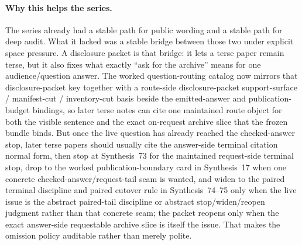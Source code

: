 \documentclass[11pt]{article}
\begin{document}
\paragraph{Why this helps the series.}
The series already had a stable path for public wording and a stable path for deep audit.
What it lacked was a stable bridge between those two under explicit space pressure.
A disclosure packet is that bridge: it lets a terse paper remain terse, but it also fixes what exactly ``ask for the archive'' means for one audience/question answer. The worked question-routing catalog now mirrors that disclosure-packet key together with a route-side disclosure-packet support-surface / manifest-cut / inventory-cut basis beside the emitted-answer and publication-budget bindings, so later terse notes can cite one maintained route object for both the visible sentence and the exact on-request archive slice that the frozen bundle binds.
But once the live question has already reached the checked-answer stop, later terse papers should usually cite the answer-side terminal citation normal form, then stop at Synthesis~73 for the maintained request-side terminal stop, drop to the worked publication-boundary card in Synthesis~17 when one concrete checked-answer/request-tail seam is wanted, and widen to the paired terminal discipline and paired cutover rule in Synthesis~74--75 only when the live issue is the abstract paired-tail discipline or abstract stop/widen/reopen judgment rather than that concrete seam; the packet reopens only when the exact answer-side requestable archive slice is itself the issue.\cite{series:challengeanswerreviewmenus,series:publicrequestresponsepacketrefreshresponsepacketclosureverdicts,series:pairedterminalcitationdiscipline,series:pairedterminalcutoverrules,series:workedexample}
That makes the omission policy auditable rather than merely polite.
\end{document}
